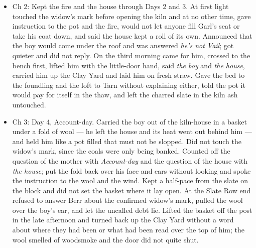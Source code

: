 \documentclass{design/chronicle}
\begin{document}
{\begin{itemize}[leftmargin=1.4em,itemsep=1pt,topsep=3pt,parsep=0pt]
\item Ch 2: Kept the fire and the house through Days 2 and 3. At first light touched the widow’s mark before opening the kiln and at no other time, gave instruction to the pot and the fire, would not let anyone fill Garl’s seat or take his coat down, and said the house kept a roll of its own. Announced that the boy would come under the roof and was answered \emph{he’s not Vail}; got quieter and did not reply. On the third morning came for him, crossed to the bench first, lifted him with the little-door hand, said \emph{the boy} and \emph{the house}, carried him up the Clay Yard and laid him on fresh straw. Gave the bed to the foundling and the loft to Tarn without explaining either, told the pot it would pay for itself in the thaw, and left the charred slate in the kiln ash untouched.

\item Ch 3: Day 4, Account-day. Carried the boy out of the kiln-house in a basket under a fold of wool --- he left the house and its heat went out behind him --- and held him like a pot filled that must not be slopped. Did not touch the widow’s mark, since the coals were only being banked. Counted off the question of the mother with \emph{Account-day} and the question of the house with \emph{the house}; put the fold back over his face and ears without looking and spoke the instruction to the wool and the wind. Kept a half-pace from the slate on the block and did not set the basket where it lay open. At the Slate Row end refused to answer Berr about the confirmed widow’s mark, pulled the wool over the boy’s ear, and let the uncalled debt lie. Lifted the basket off the post in the late afternoon and turned back up the Clay Yard without a word about where they had been or what had been read over the top of him; the wool smelled of woodsmoke and the door did not quite shut.

\end{itemize}

\begin{itemize}[leftmargin=1.4em,itemsep=1pt,topsep=3pt,parsep=0pt]


\end{itemize}}
\end{document}
